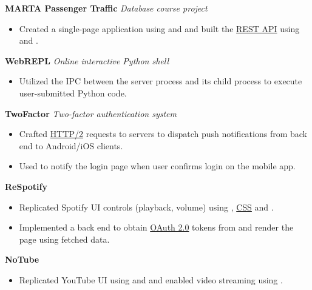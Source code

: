 \documentclass[11pt]{article}
\begin{document}
\vspace{0.5em}
%
\textbf{MARTA Passenger Traffic} \enspace \textit{\color{gray} Database course project}
\begin{itemize}[leftmargin=15pt, noitemsep, topsep=0pt]
\item Created a single-page application using \underline{} and \underline{} and built the \underline{REST API} using \underline{} and \underline{}.
\end{itemize}
\vspace{0.5em}
%
\textbf{WebREPL}  \enspace \textit{\color{gray} Online interactive Python shell}
\begin{itemize}[leftmargin=15pt, noitemsep, topsep=0pt]
\item Utilized the IPC between the \underline{} server process and its \underline{} child process to execute user-submitted Python code.
\end{itemize}
\vspace{0.5em}
%
\textbf{TwoFactor} \enspace \textit{\color{gray} Two-factor authentication system}
\begin{itemize}[leftmargin=15pt, noitemsep, topsep=0pt]
\item Crafted \underline{HTTP/2} requests to \underline{} servers to dispatch push notifications from back end to Android/iOS clients.
\item Used \underline{} to notify the login page when user confirms login on the mobile app.
\end{itemize}
\vspace{0.5em}
%
\textbf{ReSpotify}
\begin{itemize}[leftmargin=15pt, noitemsep, topsep=0pt]
\item Replicated Spotify UI controls (playback, volume) using \underline{}, \underline{CSS} and \underline{}.
\item Implemented a \underline{} back end to obtain \underline{OAuth 2.0} tokens from \underline{} and render the page using fetched data.
\end{itemize}
\vspace{0.5em}
%
\textbf{NoTube}
\begin{itemize}[leftmargin=15pt, noitemsep, topsep=0pt]
\item Replicated YouTube UI using \underline{} and \underline{} and enabled video streaming using \underline{}.
\end{itemize}
\end{document}
